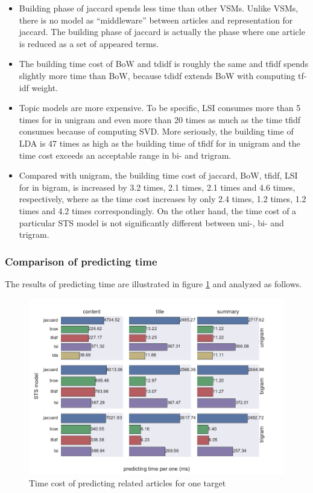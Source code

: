 \begin{itemize}


\item Building phase of jaccard spends less time than other VSMs. Unlike VSMs, there is no model as ``middleware'' between articles and representation for jaccard. The building phase of jaccard is actually the phase where one article is reduced as a set of appeared terms. 

\item The building time cost of BoW and tdidf is roughly the same and tfidf spends slightly more time than BoW, because tdidf extends BoW with computing tf-idf weight. 

\item Topic models are more expensive. To be specific, LSI consumes more than 5 times for \icontent{} in unigram and even more than 20 times as much as the time tfidf consumes because of computing SVD. More seriously, the building time of LDA is 47 times as high as the building time of tfidf for \icontent{} in unigram and the time cost exceeds an acceptable range in bi- and trigram. 

\item Compared with unigram, the building time cost of jaccard, BoW, tfidf, LSI for \icontent{} in bigram, is increased by 3.2 times, 2.1 times, 2.1 times and 4.6 times, respectively, where as the time cost increases by only 2.4 times, 1.2 times, 1.2 times and 4.2 times correspondingly. On the other hand, the time cost of a particular STS model is not significantly different between uni-, bi- and trigram.

\end{itemize}

\subsubsection{Comparison of predicting time}

The results of predicting time are illustrated in figure \ref{fig:predict_time} and analyzed as follows. 
\begin{figure}[!htb]
    \centering
    \includegraphics[width=\textwidth]{fig/predicting_time}
    \caption{Time cost of predicting related articles for one target}
    \label{fig:predict_time}
\end{figure}

